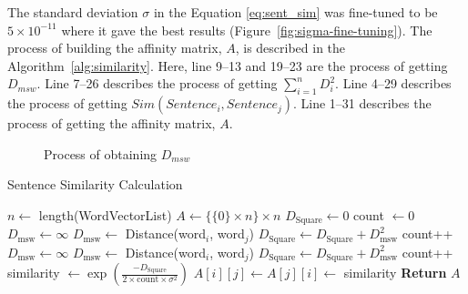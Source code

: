 The standard deviation $\sigma$ in the Equation \ref{eq:sent_sim} was fine-tuned to be $5\times10^{-11}$ where it gave the best results (Figure~\ref{fig:sigma-fine-tuning}). The process of building the affinity matrix, $A$, is described in the Algorithm~\ref{alg:similarity}. Here, line 9--13 and 19--23 are the process of getting $D_{msw}$. Line 7--26 describes the process of getting $\sum^n_{i=1}D_i^2$. Line 4--29 describes the process of getting $Sim(Sentence_i,Sentence_j)$. Line 1--31 describes the process of getting the affinity matrix, $A$.

\begin{figure}
    \centering
    
    \caption{Process of obtaining $D_{msw}$}
    \label{fig:msd}
\end{figure}
\begin{algorithm} \caption{Sentence Similarity Calculation} \label{alg:similarity}
\begin{algorithmic}[1]
    \State $n \gets$ length(WordVectorList)
    \State $A \gets \{ \{0\} \times n \} \times n$
        \State $D_{\text{Square}} \gets 0$
        \State count $\gets 0$
                \State $D_{\text{msw}} \gets \infty$
                        \State $D_{\text{msw}} \gets$ Distance(word$_i$, word$_j$)
                    \EndIf
                \EndFor
                \State $D_{\text{Square}} \gets D_{\text{Square}} + D_{\text{msw}}^2$
                \State count++
            \EndFor
                \State $D_{\text{msw}} \gets \infty$
                        \State $D_{\text{msw}} \gets$ Distance(word$_i$, word$_j$)
                    \EndIf
                \EndFor
                \State $D_{\text{Square}} \gets D_{\text{Square}} + D_{\text{msw}}^2$
                \State count++
            \EndFor
            \State similarity $\gets \exp \left( \frac{- D_{\text{Square}}}{2 \times \text{count} \times \sigma^2} \right)$
            \State $A[i][j] \gets A[j][i] \gets$ similarity
        \EndFor
    \EndFor
    \State \textbf{Return} $A$
\end{algorithmic}
\end{algorithm}

